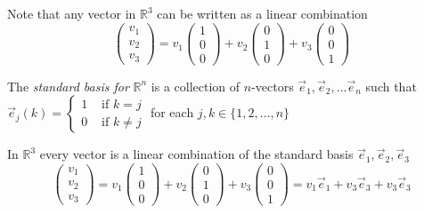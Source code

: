 \begin{example}
Note that any vector in $\mathbb{R}^3$ can be written as a linear combination
\[
\begin{pmatrix}v_1 \\ v_2 \\ v_3\end{pmatrix}=
v_1 \begin{pmatrix}1 \\ 0 \\ 0\end{pmatrix}+
v_2 \begin{pmatrix}0 \\ 1 \\ 0\end{pmatrix}+
v_3 \begin{pmatrix}0 \\ 0 \\ 1\end{pmatrix}
\]
\end{example}

\begin{definition}
The \emph{standard basis for} $\mathbb{R}^n$ is a collection of $n$-vectors $\vec{e}_1, \vec{e}_2, \ldots \vec{e}_n$ such that
$\vec{e}_j(k)=\begin{cases}
1 & \text{ if } k=j\\
0 & \text{ if } k\neq j
\end{cases}$ 
for each $j,k \in \{1, 2, \ldots, n\}$
\end{definition}

\begin{example}
In $\mathbb{R}^3 $ every vector is a linear combination of the standard basis $\vec{e}_1,\vec{e}_2,\vec{e}_3$
\[
\begin{pmatrix}v_1 \\ v_2 \\ v_3\end{pmatrix}=
v_1 \begin{pmatrix}1 \\ 0 \\ 0\end{pmatrix}+
v_2 \begin{pmatrix}0 \\ 1 \\ 0\end{pmatrix}+
v_3 \begin{pmatrix}0 \\ 0 \\ 1\end{pmatrix}
=v_1\vec{e}_1+v_3\vec{e}_3+v_3\vec{e}_3
\]
\end{example}

